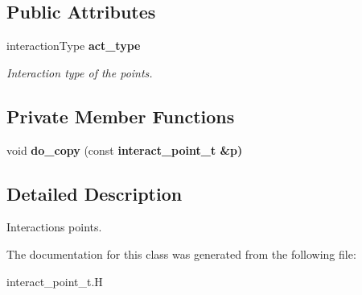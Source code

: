 \subsection*{Public Attributes}
\begin{CompactItemize}
\item 
interaction\-Type \bf{act\_\-type}\label{classSimSite3D_1_1interact__point__t_63eee3d009abf146282a6a8bf73bbaec}

\begin{CompactList}\small\item\em Interaction type of the points. \item\end{CompactList}\end{CompactItemize}
\subsection*{Private Member Functions}
\begin{CompactItemize}
\item 
void \textbf{do\_\-copy} (const \bf{interact\_\-point\_\-t} \&p)\label{classSimSite3D_1_1interact__point__t_01ba09e2cc58d89156b62a2398e24de1}

\end{CompactItemize}


\subsection{Detailed Description}
Interactions points. 



The documentation for this class was generated from the following file:\begin{CompactItemize}
\item 
interact\_\-point\_\-t.H\end{CompactItemize}
